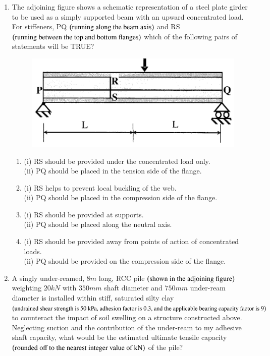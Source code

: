 \documentclass[journal,12pt,onecolumn]{IEEEtran}
\theoremstyle{remark}
\begin{document}
\begin{enumerate}
\item The adjoining figure shows a schematic representation of a steel plate girder to be used as a simply supported beam with an upward concentrated load. For stiffeners, PQ $\left(\text{running along the beam axis}\right)$ and RS $\left(\text{running between the top and bottom flanges}\right)$ which of the following pairs of statements will be TRUE?

\hfill{}
\begin{figure}[H]
\centering
\includegraphics[width=0.4\columnwidth]{figs/q35.png}
\caption*{}
\label{fig:Q.35}
\end{figure}
\begin{enumerate}
\item (i) RS should be provided under the concentrated load only.\\
      (ii) PQ should be placed in the tension side of the flange.
\item (i) RS helps to prevent local buckling of the web.\\
      (ii) PQ should be placed in the compression side of the flange.
\item (i) RS should be provided at supports.\\
      (ii) PQ should be placed along the neutral axis.
\item (i) RS should be provided away from points of action of concentrated loads.\\
      (ii) PQ should be provided on the compression side of the flange.
\end{enumerate}

\item A singly under-reamed, $8m$ long, RCC pile $\left(\text{shown in the adjoining figure}\right)$ weighting $20 kN$ with $350 mm$ shaft diameter and $750 mm$ under-ream diameter is installed within stiff, saturated silty clay $\left(\text{undrained shear strength is 50 kPa, adhesion factor is 0.3, and the applicable bearing capacity factor is 9}\right)$ to counteract the impact of soil swelling on a structure constructed above. Neglecting suction and the contribution of the under-ream to my adhesive shaft capacity, what would be the estimated ultimate tensile capacity $\left(\text{rounded off to the nearest integer value of kN}\right)$ of the pile?


\end{enumerate}
\end{document}
